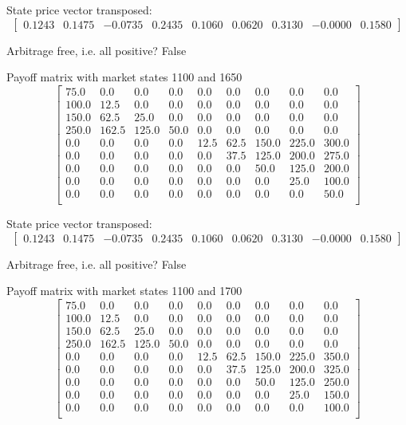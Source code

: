 \documentclass{article}
\begin{document}
State price vector transposed: \[
    \begin{bmatrix} 0.1243 & 0.1475 & -0.0735 & 0.2435 & 0.1060 & 0.0620 & 0.3130 & -0.0000 & 0.1580 \end{bmatrix}
\]

Arbitrage free, i.e. all positive? False

Payoff matrix with market states 1100 and 1650
\[
    \begin{bmatrix}
        75.0  & 0.0   & 0.0   & 0.0  & 0.0  & 0.0  & 0.0   & 0.0   & 0.0   \\
        100.0 & 12.5  & 0.0   & 0.0  & 0.0  & 0.0  & 0.0   & 0.0   & 0.0   \\
        150.0 & 62.5  & 25.0  & 0.0  & 0.0  & 0.0  & 0.0   & 0.0   & 0.0   \\
        250.0 & 162.5 & 125.0 & 50.0 & 0.0  & 0.0  & 0.0   & 0.0   & 0.0   \\
        0.0   & 0.0   & 0.0   & 0.0  & 12.5 & 62.5 & 150.0 & 225.0 & 300.0 \\
        0.0   & 0.0   & 0.0   & 0.0  & 0.0  & 37.5 & 125.0 & 200.0 & 275.0 \\
        0.0   & 0.0   & 0.0   & 0.0  & 0.0  & 0.0  & 50.0  & 125.0 & 200.0 \\
        0.0   & 0.0   & 0.0   & 0.0  & 0.0  & 0.0  & 0.0   & 25.0  & 100.0 \\
        0.0   & 0.0   & 0.0   & 0.0  & 0.0  & 0.0  & 0.0   & 0.0   & 50.0  \\
    \end{bmatrix}
\]

State price vector transposed: \[
    \begin{bmatrix} 0.1243 & 0.1475 & -0.0735 & 0.2435 & 0.1060 & 0.0620 & 0.3130 & -0.0000 & 0.1580 \end{bmatrix}
\]

Arbitrage free, i.e. all positive? False

Payoff matrix with market states 1100 and 1700
\[
    \begin{bmatrix}
        75.0  & 0.0   & 0.0   & 0.0  & 0.0  & 0.0  & 0.0   & 0.0   & 0.0   \\
        100.0 & 12.5  & 0.0   & 0.0  & 0.0  & 0.0  & 0.0   & 0.0   & 0.0   \\
        150.0 & 62.5  & 25.0  & 0.0  & 0.0  & 0.0  & 0.0   & 0.0   & 0.0   \\
        250.0 & 162.5 & 125.0 & 50.0 & 0.0  & 0.0  & 0.0   & 0.0   & 0.0   \\
        0.0   & 0.0   & 0.0   & 0.0  & 12.5 & 62.5 & 150.0 & 225.0 & 350.0 \\
        0.0   & 0.0   & 0.0   & 0.0  & 0.0  & 37.5 & 125.0 & 200.0 & 325.0 \\
        0.0   & 0.0   & 0.0   & 0.0  & 0.0  & 0.0  & 50.0  & 125.0 & 250.0 \\
        0.0   & 0.0   & 0.0   & 0.0  & 0.0  & 0.0  & 0.0   & 25.0  & 150.0 \\
        0.0   & 0.0   & 0.0   & 0.0  & 0.0  & 0.0  & 0.0   & 0.0   & 100.0 \\
    \end{bmatrix}
\]
\end{document}
